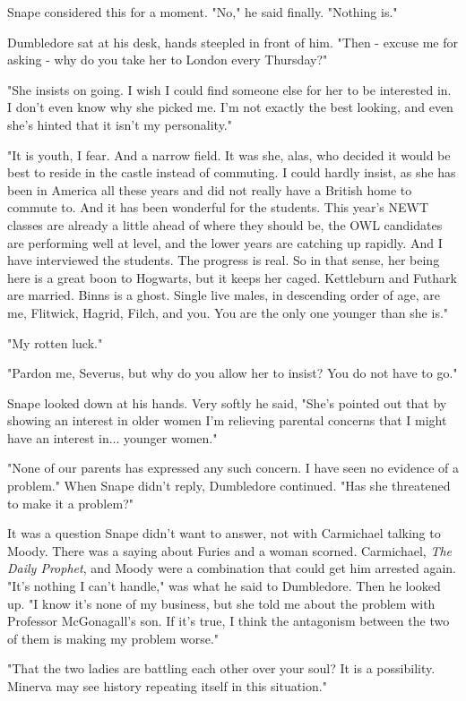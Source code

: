 \documentclass[a4paper,11pt]{article}
\begin{document}
Snape considered this for a moment. "No," he said finally. "Nothing is."

Dumbledore sat at his desk, hands steepled in front of him. "Then - excuse me for asking - why do you take her to London every Thursday?"

"She insists on going. I wish I could find someone else for her to be interested in. I don't even know why she picked me. I'm not exactly the best looking, and even she's hinted that it isn't my personality."

"It is youth, I fear. And a narrow field. It was she, alas, who decided it would be best to reside in the castle instead of commuting. I could hardly insist, as she has been in America all these years and did not really have a British home to commute to. And it has been wonderful for the students. This year's NEWT classes are already a little ahead of where they should be, the OWL candidates are performing well at level, and the lower years are catching up rapidly. And I have interviewed the students. The progress is real. So in that sense, her being here is a great boon to Hogwarts, but it keeps her caged. Kettleburn and Futhark are married. Binns is a ghost. Single live males, in descending order of age, are me, Flitwick, Hagrid, Filch, and you. You are the only one younger than she is."

"My rotten luck."

"Pardon me, Severus, but why do you allow her to insist? You do not have to go."

Snape looked down at his hands. Very softly he said, "She's pointed out that by showing an interest in older women I'm relieving parental concerns that I might have an interest in... younger women."

"None of our parents has expressed any such concern. I have seen no evidence of a problem." When Snape didn't reply, Dumbledore continued. "Has she threatened to make it a problem?"

It was a question Snape didn't want to answer, not with Carmichael talking to Moody. There was a saying about Furies and a woman scorned. Carmichael, \emph{The Daily Prophet}, and Moody were a combination that could get him arrested again. "It's nothing I can't handle," was what he said to Dumbledore. Then he looked up. "I know it's none of my business, but she told me about the problem with Professor McGonagall's son. If it's true, I think the antagonism between the two of them is making my problem worse."

"That the two ladies are battling each other over your soul? It is a possibility. Minerva may see history repeating itself in this situation."
\end{document}
